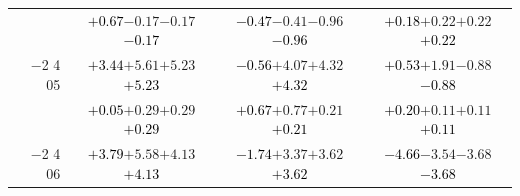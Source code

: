 \documentclass[compress]{beamer}
\begin{document}
\begin{frame}
\begin{tabular}{r | c | c | c}
          & \textcolor{black}{$+0.67$}\hspace{0.1 cm}$-0.17$\hspace{0.1 cm}$-0.17$\hspace{0.1 cm}\textcolor{black}{$-0.17$} & \textcolor{black}{$-0.47$}\hspace{0.1 cm}$-0.41$\hspace{0.1 cm}$-0.96$\hspace{0.1 cm}\textcolor{black}{$-0.96$} & \textcolor{black}{$+0.18$}\hspace{0.1 cm}$+0.22$\hspace{0.1 cm}$+0.22$\hspace{0.1 cm}\textcolor{black}{$+0.22$} \\
$-$2 4 05 & \textcolor{black}{$+3.44$}\hspace{0.1 cm}$+5.61$\hspace{0.1 cm}$+5.23$\hspace{0.1 cm}\textcolor{black}{$+5.23$} & \textcolor{black}{$-0.56$}\hspace{0.1 cm}$+4.07$\hspace{0.1 cm}$+4.32$\hspace{0.1 cm}\textcolor{black}{$+4.32$} & \textcolor{black}{$+0.53$}\hspace{0.1 cm}$+1.91$\hspace{0.1 cm}$-0.88$\hspace{0.1 cm}\textcolor{black}{$-0.88$} \\
          & \textcolor{black}{$+0.05$}\hspace{0.1 cm}$+0.29$\hspace{0.1 cm}$+0.29$\hspace{0.1 cm}\textcolor{black}{$+0.29$} & \textcolor{black}{$+0.67$}\hspace{0.1 cm}$+0.77$\hspace{0.1 cm}$+0.21$\hspace{0.1 cm}\textcolor{black}{$+0.21$} & \textcolor{black}{$+0.20$}\hspace{0.1 cm}$+0.11$\hspace{0.1 cm}$+0.11$\hspace{0.1 cm}\textcolor{black}{$+0.11$} \\
$-$2 4 06 & \textcolor{black}{$+3.79$}\hspace{0.1 cm}$+5.58$\hspace{0.1 cm}$+4.13$\hspace{0.1 cm}\textcolor{black}{$+4.13$} & \textcolor{black}{$-1.74$}\hspace{0.1 cm}$+3.37$\hspace{0.1 cm}$+3.62$\hspace{0.1 cm}\textcolor{black}{$+3.62$} & \textcolor{black}{$-4.66$}\hspace{0.1 cm}$-3.54$\hspace{0.1 cm}$-3.68$\hspace{0.1 cm}\textcolor{black}{$-3.68$} \\

\end{tabular}
\end{frame}
\end{document}
